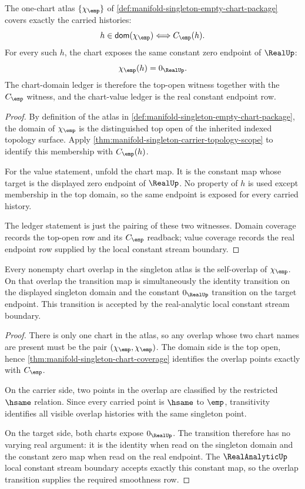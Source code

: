 \begin{theorem}
\label{thm:manifold-singleton-chart-coverage}
The one-chart atlas $\{\chi_{\emp}\}$ of
\autoref{def:manifold-singleton-empty-chart-package} covers exactly the
carried histories:
$$
h\in\mathsf{dom}(\chi_{\emp})
\Longleftrightarrow
C_{\emp}(h).
$$
For every such $h$, the chart exposes the same constant zero endpoint of
$\RealUp$:
$$
\chi_{\emp}(h)=0_{\RealUp}.
$$
The chart-domain ledger is therefore the top-open witness together with the
$C_{\emp}$ witness, and the chart-value ledger is the real constant endpoint
row.
\end{theorem}
\begin{proof}
By definition of the atlas in
\autoref{def:manifold-singleton-empty-chart-package}, the domain of
$\chi_{\emp}$ is the distinguished top open of the inherited indexed topology
surface. Apply
\autoref{thm:manifold-singleton-carrier-topology-scope} to identify this
membership with $C_{\emp}(h)$.

For the value statement, unfold the chart map. It is the constant map whose
target is the displayed zero endpoint of $\RealUp$. No property of $h$ is used
except membership in the top domain, so the same endpoint is exposed for every
carried history.

The ledger statement is just the pairing of these two witnesses. Domain
coverage records the top-open row and its $C_{\emp}$ readback; value coverage
records the real endpoint row supplied by the local constant stream boundary.
\end{proof}

\begin{theorem}
\label{thm:manifold-singleton-transition-smoothness}
Every nonempty chart overlap in the singleton atlas is the self-overlap of
$\chi_{\emp}$. On that overlap the transition map is simultaneously the
identity transition on the displayed singleton domain and the constant
$0_{\RealUp}$ transition on the target endpoint. This transition is accepted by
the real-analytic local constant stream boundary.
\end{theorem}
\begin{proof}
There is only one chart in the atlas, so any overlap whose two chart names are
present must be the pair $(\chi_{\emp},\chi_{\emp})$. The domain side is the
top open, hence \autoref{thm:manifold-singleton-chart-coverage} identifies the
overlap points exactly with $C_{\emp}$.

On the carrier side, two points in the overlap are classified by the restricted
$\hsame$ relation. Since every carried point is $\hsame$ to $\emp$, transitivity
identifies all visible overlap histories with the same singleton point.

On the target side, both charts expose $0_{\RealUp}$. The transition therefore
has no varying real argument: it is the identity when read on the singleton
domain and the constant zero map when read on the real endpoint. The
$\RealAnalyticUp$ local constant stream boundary accepts exactly this constant
map, so the overlap transition supplies the required smoothness row.
\end{proof}

